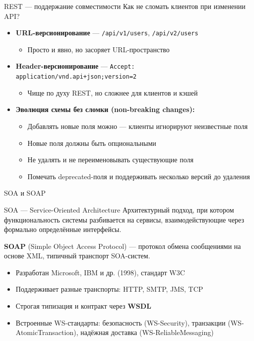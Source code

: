 \documentclass{beamer}
\begin{document}
\begin{frame}{REST --- поддержание совместимости}
Как не сломать клиентов при изменении API?
\begin{itemize}
  \item \textbf{URL-версионирование} --- \texttt{/api/v1/users}, \texttt{/api/v2/users}
  \begin{itemize}
    \item Просто и явно, но засоряет URL-пространство
  \end{itemize}
  \item \textbf{Header-версионирование} --- \texttt{Accept: application/vnd.api+json;version=2}
  \begin{itemize}
    \item Чище по духу REST, но сложнее для клиентов и кэшей
  \end{itemize}
  \item \textbf{Эволюция схемы без сломки (non-breaking changes):}
  \begin{itemize}
    \item Добавлять новые поля можно --- клиенты игнорируют неизвестные поля
    \item Новые поля должны быть опциональными
    \item Не удалять и не переименовывать существующие поля
    \item Помечать deprecated-поля и поддерживать несколько версий до удаления
  \end{itemize}
\end{itemize}
\end{frame}

\begin{frame}{SOA и SOAP}
\begin{block}{SOA --- Service-Oriented Architecture}
  Архитектурный подход, при котором функциональность системы разбивается на сервисы, взаимодействующие через формально определённые интерфейсы.
\end{block}
\vspace{0.3cm}
\textbf{SOAP} (Simple Object Access Protocol) --- протокол обмена сообщениями на основе XML, типичный транспорт SOA-систем.
\begin{itemize}
  \item Разработан Microsoft, IBM и др. (1998), стандарт W3C
  \item Поддерживает разные транспорты: HTTP, SMTP, JMS, TCP
  \item Строгая типизация и контракт через \textbf{WSDL}
  \item Встроенные WS-стандарты: безопасность (WS-Security), транзакции (WS-AtomicTransaction), надёжная доставка (WS-ReliableMessaging)
\end{itemize}
\end{frame}
\end{document}
